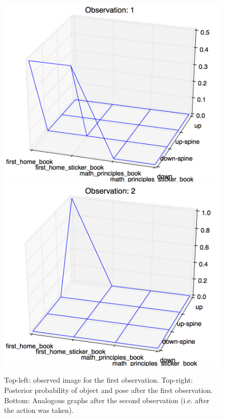     \begin{figure}
    		\includegraphics[width = 0.6\columnwidth]{pics/experimentObs1.png}\\
    		\includegraphics[width = 0.6\columnwidth]{pics/experimentObs2.png}

	\caption{ Top-left: observed image for the first observation. Top-right: Posterior probability of object and pose after the first observation.	Bottom: Analogous graphs after the second observation (i.e. after the action was taken).}
    	\label{fig:posteriors}
    \end{figure}

